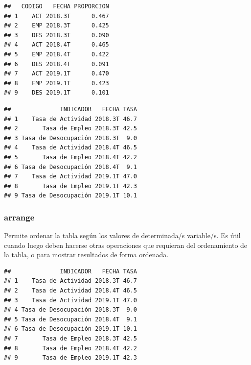 \documentclass[]{book}
\newenvironment{Shaded}{\begin{snugshade}}{\end{snugshade}}
\newcommand{\KeywordTok}[1]{\textcolor[rgb]{0.13,0.29,0.53}{\textbf{#1}}}
\newcommand{\NormalTok}[1]{#1}
\newcommand{\OperatorTok}[1]{\textcolor[rgb]{0.81,0.36,0.00}{\textbf{#1}}}
\newcommand{\StringTok}[1]{\textcolor[rgb]{0.31,0.60,0.02}{#1}}
\begin{document}
\begin{verbatim}
##   CODIGO   FECHA PROPORCION
## 1    ACT 2018.3T      0.467
## 2    EMP 2018.3T      0.425
## 3    DES 2018.3T      0.090
## 4    ACT 2018.4T      0.465
## 5    EMP 2018.4T      0.422
## 6    DES 2018.4T      0.091
## 7    ACT 2019.1T      0.470
## 8    EMP 2019.1T      0.423
## 9    DES 2019.1T      0.101
\end{verbatim}

\begin{Shaded}
\end{Shaded}

\begin{verbatim}
##              INDICADOR   FECHA TASA
## 1    Tasa de Actividad 2018.3T 46.7
## 2       Tasa de Empleo 2018.3T 42.5
## 3 Tasa de Desocupación 2018.3T  9.0
## 4    Tasa de Actividad 2018.4T 46.5
## 5       Tasa de Empleo 2018.4T 42.2
## 6 Tasa de Desocupación 2018.4T  9.1
## 7    Tasa de Actividad 2019.1T 47.0
## 8       Tasa de Empleo 2019.1T 42.3
## 9 Tasa de Desocupación 2019.1T 10.1
\end{verbatim}

\hypertarget{arrange}{%
\subsubsection{arrange}\label{arrange}}

Permite ordenar la tabla según los valores de determinada/s variable/s. Es útil cuando luego deben hacerse otras operaciones que requieran del ordenamiento de la tabla, o para mostrar resultados de forma ordenada.

\begin{Shaded}
\end{Shaded}

\begin{verbatim}
##              INDICADOR   FECHA TASA
## 1    Tasa de Actividad 2018.3T 46.7
## 2    Tasa de Actividad 2018.4T 46.5
## 3    Tasa de Actividad 2019.1T 47.0
## 4 Tasa de Desocupación 2018.3T  9.0
## 5 Tasa de Desocupación 2018.4T  9.1
## 6 Tasa de Desocupación 2019.1T 10.1
## 7       Tasa de Empleo 2018.3T 42.5
## 8       Tasa de Empleo 2018.4T 42.2
## 9       Tasa de Empleo 2019.1T 42.3
\end{verbatim}
\end{document}
